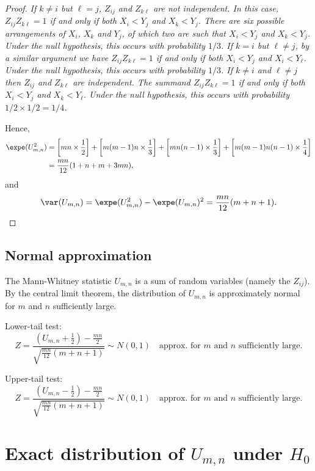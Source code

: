 \begin{proof}
\it
If $k\neq i$ but $\ell=j$, $Z_{ij}$ and $Z_{k\ell}$ are not independent. In this case, $Z_{ij}Z_{k\ell}=1$ if and only if both $X_i<Y_j$ and $X_k<Y_j$. There are six possible arrangements of $X_i$, $X_k$ and $Y_j$, of which two are such that $X_i<Y_j$ and $X_k<Y_j$. Under the null hypothesis, this occurs with probability $1/3$.
\it
If $k=i$ but $\ell\neq j$, by a similar argument we have $Z_{ij}Z_{k\ell}=1$ if and only if both $X_i<Y_j$ and $X_i<Y_{\ell}$. Under the null hypothesis, this occurs with probability $1/3$.
\it
If $k\neq i$ and $\ell\neq j$ then $Z_{ij}$ and $Z_{k\ell}$ are independent. The summand $Z_{ij}Z_{k\ell}=1$ if and only if both $X_i<Y_j$ and $X_k<Y_{\ell}$. Under the null hypothesis, this occurs with probability $1/2\times 1/2 = 1/4$.
\een

Hence, 
\begin{align*}
\expe(U_{m,n}^2)
	& = \left[mn\times\frac{1}{2}\right] + \left[m(m-1)n\times\frac{1}{3}\right] 
			+ \left[mn(n-1)\times\frac{1}{3}\right] + \left[m(m-1)n(n-1)\times\frac{1}{4}\right] \\
	& = \frac{mn}{12}(1 + n + m + 3mn),
\end{align*}
and
\[
\var(U_{m,n}) = \expe(U_{m,n}^2) - \expe(U_{m,n})^2 = \frac{mn}{12}(m+n+1).
\]
\vspace*{-1ex}
\end{proof}
\subsection{Normal approximation}

The Mann-Whitney statistic $U_{m,n}$ is a sum of random variables (namely the $Z_{ij}$). By the central limit theorem, the distribution of $U_{m,n}$ is approximately normal for $m$ and $n$ sufficiently large. 

\vspace*{2ex}
Lower-tail test:
\[
Z = \frac{(U_{m,n}+\frac{1}{2}) - \frac{mn}{2}}{\sqrt{\frac{mn}{12}(m+n+1)}} \sim  N(0,1)\quad\text{approx. for $m$ and $n$ sufficiently large.}
\]

Upper-tail test:
\[
Z = \frac{(U_{m,n}-\frac{1}{2}) - \frac{mn}{2}}{\sqrt{\frac{mn}{12}(m+n+1)}} \sim  N(0,1)\quad\text{approx. for $m$ and $n$ sufficiently large.}
\]



\section{Exact distribution of $U_{m,n}$ under $H_0$}

